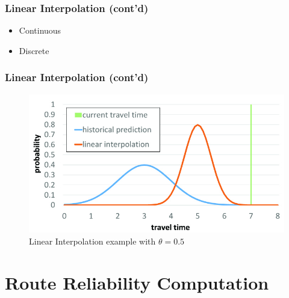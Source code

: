 \documentclass[t]{beamer}
\begin{document}
\begin{frame}\frametitle{Linear Interpolation \small{(cont'd)}}
\begin{itemize}
\item<1-> Continuous
\item<2-> Discrete
\end{itemize}

\end{frame}

\begin{frame}\frametitle{Linear Interpolation \small{(cont'd)}}
\begin{figure}
    \centering
    \includegraphics[width=0.80\columnwidth]{tt_interpolation.jpg}\\
    Linear Interpolation example with $\theta = 0.5$
\end{figure}
\end{frame}

\section{Route Reliability Computation}
\end{document}
